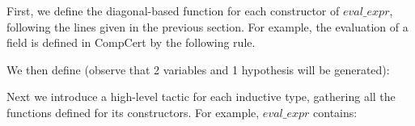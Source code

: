 

First, we define the diagonal-based function for each constructor 
of $eval\_expr$, following the lines given in the previous section.
For example, 
the evaluation of a field is defined in CompCert by the following rule.

\medskip
{}
\medskip

\noindent
We then define (observe that 2 variables and 1 hypothesis will be generated):

\medskip
{}
\medskip

%
%


Next we introduce a high-level tactic 
for each inductive type, gathering all the functions defined for 
its constructors. %
For example, $eval\_expr$ contains:

